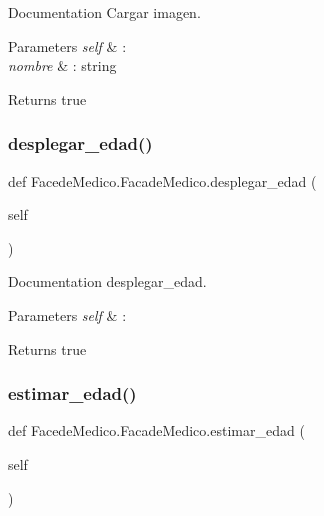 Documentation Cargar imagen. 


\begin{DoxyParams}{Parameters}
{\em self} & \+: \\
\hline
{\em nombre} & \+: string \\
\hline
\end{DoxyParams}
\begin{DoxyReturn}{Returns}
true 
\end{DoxyReturn}
\mbox{\label{class_facede_medico_1_1_facade_medico_a865f5e402914ba2461306bed197fc3c7}} 
\subsubsection{\texorpdfstring{desplegar\+\_\+edad()}{desplegar\_edad()}}
{\footnotesize\ttfamily def Facede\+Medico.\+Facade\+Medico.\+desplegar\+\_\+edad (\begin{DoxyParamCaption}\item[{}]{self }\end{DoxyParamCaption})}



Documentation desplegar\+\_\+edad. 


\begin{DoxyParams}{Parameters}
{\em self} & \+: \\
\hline
\end{DoxyParams}
\begin{DoxyReturn}{Returns}
true 
\end{DoxyReturn}
\mbox{\label{class_facede_medico_1_1_facade_medico_a23738769ea9bd5016e9bc191c83a3fed}} 
\subsubsection{\texorpdfstring{estimar\+\_\+edad()}{estimar\_edad()}}
{\footnotesize\ttfamily def Facede\+Medico.\+Facade\+Medico.\+estimar\+\_\+edad (\begin{DoxyParamCaption}\item[{}]{self }\end{DoxyParamCaption})}




